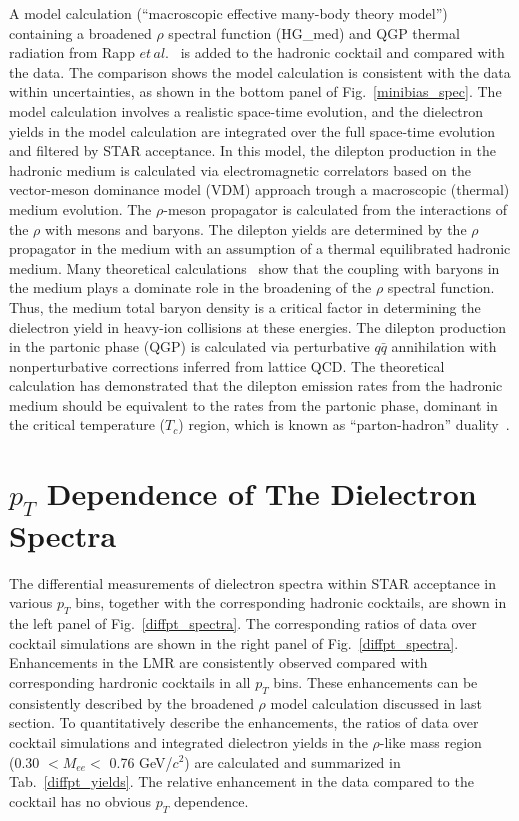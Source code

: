 A model calculation (``macroscopic effective many-body theory model'') containing a broadened $\rho$ spectral function (HG\_med) and QGP thermal radiation from Rapp $et\,al.$~\cite{broaden1,broaden2,broaden3,broaden4} is added to the hadronic cocktail and compared with the data. The comparison shows the model calculation is consistent with the data within uncertainties, as shown in the bottom panel of Fig.~\ref{minibias_spec}. The model calculation involves a realistic space-time evolution, and the dielectron yields in the model calculation are integrated over the full space-time evolution and filtered by STAR acceptance. In this model, the dilepton production in the hadronic medium is calculated via electromagnetic correlators based on the vector-meson dominance model (VDM) approach trough a macroscopic (thermal) medium evolution. The $\rho$-meson propagator is calculated from the interactions of the $\rho$ with mesons and baryons. The dilepton yields are determined by the $\rho$ propagator in the medium with an assumption of a thermal equilibrated hadronic medium. Many theoretical calculations~\cite{dileptonMed0,dileptonMed1,dileptonMed2} show that the coupling with baryons in the medium plays a dominate role in the broadening of the $\rho$ spectral function. Thus, the medium total baryon density is a critical factor in determining the dielectron yield in heavy-ion collisions at these energies. The dilepton production in the partonic phase (QGP) is calculated via perturbative $q\bar{q}$ annihilation with nonperturbative corrections inferred from lattice QCD. The theoretical calculation has demonstrated that the dilepton emission rates from the hadronic medium should be equivalent to the rates from the partonic phase, dominant in the critical temperature ($T_{c}$) region, which is known as ``parton-hadron'' duality~\cite{LMRDileptonTheory}.

\section{$p_{T}$ Dependence of The Dielectron Spectra}
The differential measurements of dielectron spectra within STAR acceptance in various $p_{T}$ bins, together with the corresponding hadronic cocktails, are shown in the left panel of Fig.~\ref{diffpt_spectra}. The corresponding ratios of data over cocktail simulations are shown in the right panel of Fig.~\ref{diffpt_spectra}. Enhancements in the LMR are consistently observed compared with corresponding hardronic cocktails in all $p_{T}$ bins.  These enhancements can be consistently described by the broadened $\rho$ model calculation discussed in last section. To quantitatively describe the enhancements, the ratios of data over cocktail simulations and integrated dielectron yields in the $\rho$-like mass region (0.30 $<M_{ee}<$ 0.76 GeV/$c^{2}$) are calculated and summarized in Tab.~\ref{diffpt_yields}. The relative enhancement in the data compared to the cocktail has no obvious $p_{T}$ dependence.

